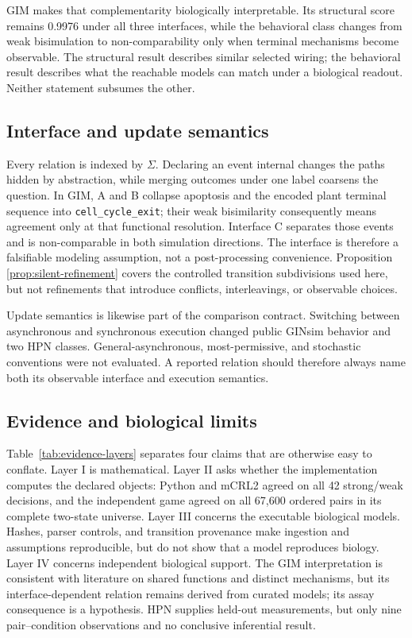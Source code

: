 \documentclass{ws-jbcb}
\numberwithin{equation}{section}
\begin{document}
GIM makes that complementarity biologically interpretable. Its structural score
remains 0.9976 under all three interfaces, while the behavioral class changes
from weak bisimulation to non-comparability only when terminal mechanisms become
observable. The structural result describes similar selected wiring; the
behavioral result describes what the reachable models can match under a
biological readout. Neither statement subsumes the other.

\subsection{Interface and update semantics}
\label{sec:discussion-interface}

Every relation is indexed by $\Sigma$. Declaring an event internal changes the
paths hidden by abstraction, while merging outcomes under one label coarsens the
question. In GIM, A and B collapse apoptosis and the encoded plant terminal
sequence into \texttt{cell\_cycle\_exit}; their weak bisimilarity consequently
means agreement only at that functional resolution. Interface C separates those
events and is non-comparable in both simulation directions. The interface is
therefore a falsifiable modeling assumption, not a post-processing convenience.
Proposition \ref{prop:silent-refinement} covers the controlled transition
subdivisions used here, but not refinements that introduce conflicts,
interleavings, or observable choices.

Update semantics is likewise part of the comparison contract. Switching between
asynchronous and synchronous execution changed public GINsim behavior and two HPN
classes. General-asynchronous, most-permissive, and stochastic conventions were
not evaluated.\cite{Pauleve2020} A reported relation should therefore always name
both its observable interface and execution semantics.

\subsection{Evidence and biological limits}
\label{sec:discussion-biological}

Table~\ref{tab:evidence-layers} separates four claims that are otherwise easy to
conflate. Layer I is mathematical. Layer II asks whether the implementation
computes the declared objects: Python and mCRL2 agreed on all 42 strong/weak
decisions, and the independent game agreed on all 67,600 ordered pairs in its
complete two-state universe. Layer III concerns the executable biological
models. Hashes, parser controls, and transition provenance make ingestion and
assumptions reproducible, but do not show that a model reproduces biology.
Layer IV concerns independent biological support. The GIM interpretation is
consistent with literature on shared functions and distinct mechanisms, but its
interface-dependent relation remains derived from curated models; its assay
consequence is a hypothesis. HPN supplies held-out measurements, but only nine
pair--condition observations and no conclusive inferential result.
\end{document}
